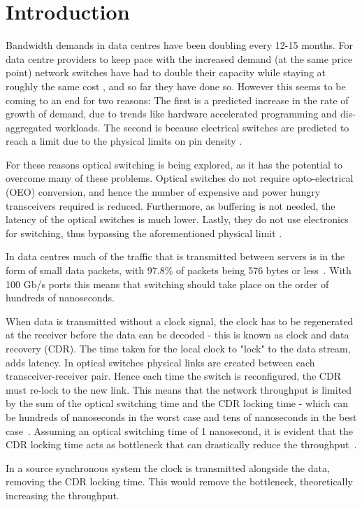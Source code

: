 \chapter{Introduction}
Bandwidth demands in data centres have been doubling every 12-15 months. For
data centre providers to keep pace with the increased demand (at the same price
point) network switches have had to double their capacity while staying at
roughly the same cost \cite{singh2016jupiter}, and so far they have done so.
However this  seems to be coming to an end for two reasons: The first is a
predicted increase in the rate of growth of demand, due to trends like hardware
accelerated programming and dis-aggregated workloads. The second is because
electrical switches are predicted to reach a limit due to the physical limits
on pin density \cite{ballani2018bridging}.

For these reasons optical switching is being explored, as it has the potential
to overcome many of these problems. Optical switches do not require
opto-electrical (OEO) conversion, and hence the number of expensive and power
hungry transceivers required is reduced. Furthermore, as buffering is not
needed, the latency of the optical switches is much lower. Lastly, they do not
use electronics for switching, thus bypassing the aforementioned physical limit
\cite{ballani2018bridging}. 

In data centres much of the traffic that is transmitted between servers is in
the form of small data packets, with 97.8\% of packets being 576 bytes or
less~\cite{data_size}. With 100 Gb/s ports this means that switching should
take place on the order of hundreds of nanoseconds. 

When data is transmitted without a clock signal, the clock has to be
regenerated at the receiver before the data can be decoded - this is known as
clock and data recovery (CDR). The time taken for the local clock to "lock" to
the data stream, adds latency. 
In optical switches physical links are created between each
transceiver-receiver pair. Hence each time the switch is reconfigured, the CDR
must re-lock to the new link.  This means that the network throughput is
limited by the sum of the optical switching time and the CDR locking time -
which can be hundreds of nanoseconds in the worst case and tens of
nanoseconds in the best case~\cite{Chen:18}. Assuming an optical switching time
of 1 nanosecond, it is evident that the CDR locking time acts as bottleneck
that can drastically reduce the throughput~\cite{kari_phase}.

In a source synchronous system the clock is transmitted alongside the data,
removing the CDR locking time. This would remove the bottleneck, theoretically
increasing the throughput.

